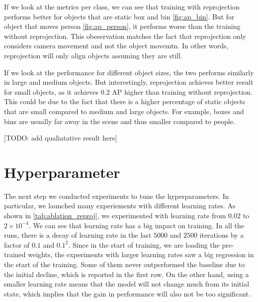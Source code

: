 If we look at the metrics per class, we can see that training with reprojection performs better for objects that are static \eg box and bin \ref{fig:ap_bin}. But for object that moves \eg person \ref{fig:ap_person}, it performs worse than the training without reprojection. This obeservation matches the fact that reprojection only considers camera movement and not the object movemtn. In other words, reprojection will only align objects assuming they are still. 

If we look at the performance for different object sizes, the two performs similarly in large and medium objects. But interestingly, reprojection achieves better result for small objects, as it achieves $0.2$ AP higher than training without reprojection. This could be due to the fact that there is a higher percentage of static objects that are small compared to medium and large objects. For example, boxes and bins are usually far away in the scene and thus smaller compared to people.

 

[TODO: add qualiatative result here]




\section{Hyperparameter}
The next step we conducted experiments to tune the hyperparameters. In particular, we launched many experiements with different learning rates. As shown in \ref{tab:ablation_reproj}, we experimented with learning rate from $0.02$ to $2\times 10^{-4}$. We can see that learning rate has a big impact on training. In all the runs, there is a decay of learning rate in the last $5000$ and $2500$ iterations by a factor of $0.1$ and $0.1^2$. Since in the start of training, we are loading the pre-trained weights, the experiments with larger learning rates saw a big regression in the start of the training. Some of them never outperformed the baseline due to the initial decline, which is reported in the first row. On the other hand, using a smaller learning rate means that the model will not change much from its initial state, which implies that the gain in performance will also not be too significant. 


 